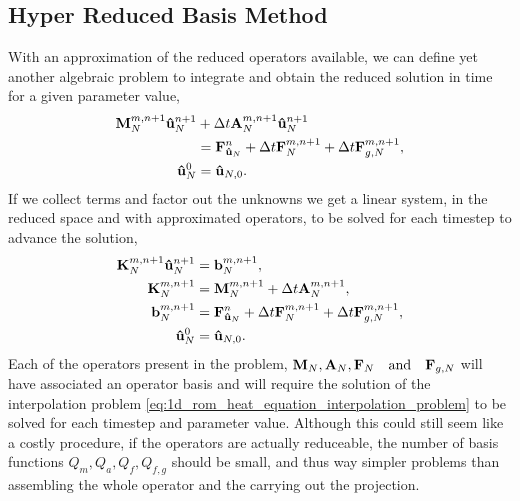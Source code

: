 \documentclass[../1_heat_equation.tex]{subfiles}
\begin{document}
\subsection{Hyper Reduced Basis Method}
With an approximation of the reduced operators available, we can define yet another algebraic problem to integrate and obtain the reduced solution in time for a given parameter value,
\begin{subequations}
    \label{eq:1d_rom_weak_formulation_discrete}
    \begin{align}
        \vb{M}^{m, n+1}_N \vb{\hat{u}}_{N}^{n+1} &+ \Delta t \vb{A}^{m, n+1}_N \vb{\hat{u}}_{N}^{n+1} \\ 
        &= \vb{F}^{n}_{\vb{\hat{u}}_N} + \Delta t \vb{F}_N^{m,n+1} + \Delta t \vb{F}^{m,n+1}_{g, N}, \nonumber \\
        \vb{\hat{u}}_N^{0} &= \vb{\hat{u}}_{N,0}.
    \end{align}
\end{subequations}
If we collect terms and factor out the unknowns we get a linear system, in the reduced space and with approximated operators, to be solved for each timestep to advance the solution,
\begin{subequations}
    \label{eq:1d_rom_linear_system_approximation_timestep}
    \begin{align}
        \vb{K}_N^{m,n+1} \vb{\hat{u}}_N^{n+1} &= \vb{b}_N^{m, n+1}, \\
        \vb{K}_N^{m,n+1} &= \vb{M}_{N}^{m,n+1} + \Delta t \vb{A}_{N}^{m,n+1}, \\
        \vb{b}_N^{m,n+1} &= \vb{F}_{\vb{\hat{u}}_N}^{n} + \Delta t \vb{F}_N^{m,n+1} + \Delta t \vb{F}_{g,N}^{m,n+1}, \\
        \vb{\hat{u}}_N^{0} &= \vb{\hat{u}}_{N,0}.
    \end{align}
\end{subequations}
Each of the operators present in the problem, $\vb{M}_N, \vb{A}_N, \vb{F}_N \qqtext{and} \vb{F}_{g,N}$ will have associated an operator basis and will require the solution of the interpolation problem \eqref{eq:1d_rom_heat_equation_interpolation_problem} to be solved for each timestep and parameter value.
Although this could still seem like a costly procedure, if the operators are actually reduceable, the number of basis functions $Q_m, Q_a, Q_f, Q_{f,g}$ should be small, and thus way simpler problems than assembling the whole operator and the carrying out the projection. 

\end{document}
